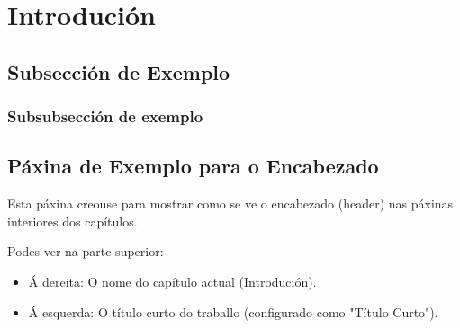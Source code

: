 \chapter{Introdución}
\label{ch:introduccion}

\section{Subsección de Exemplo}
\subsection{Subsubsección de exemplo}

\newpage
\section{Páxina de Exemplo para o Encabezado}
Esta páxina creouse para mostrar como se ve o encabezado (header) nas páxinas interiores dos capítulos. 

Podes ver na parte superior:
\begin{itemize}
    \item Á dereita: O nome do capítulo actual (Introdución).
    \item Á esquerda: O título curto do traballo (configurado como "Título Curto").
\end{itemize}
